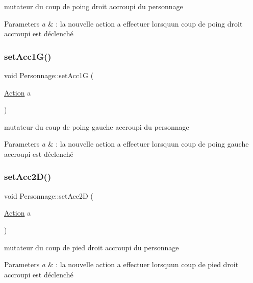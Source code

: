 mutateur du coup de poing droit accroupi du personnage 


\begin{DoxyParams}{Parameters}
{\em a} & \+: la nouvelle action a effectuer lorsqu\textquotesingle{}un coup de poing droit accroupi est déclenché \\
\hline
\end{DoxyParams}
\mbox{\label{class_personnage_aa44ab7df73f244df3ac675661630e7de}} 
\subsubsection{\texorpdfstring{set\+Acc1\+G()}{setAcc1G()}}
{\footnotesize\ttfamily void Personnage\+::set\+Acc1G (\begin{DoxyParamCaption}\item[{\hyperlink{class_action}{Action}}]{a }\end{DoxyParamCaption})}



mutateur du coup de poing gauche accroupi du personnage 


\begin{DoxyParams}{Parameters}
{\em a} & \+: la nouvelle action a effectuer lorsqu\textquotesingle{}un coup de poing gauche accroupi est déclenché \\
\hline
\end{DoxyParams}
\mbox{\label{class_personnage_abadec9cf87f25796e9467b0c58750a60}} 
\subsubsection{\texorpdfstring{set\+Acc2\+D()}{setAcc2D()}}
{\footnotesize\ttfamily void Personnage\+::set\+Acc2D (\begin{DoxyParamCaption}\item[{\hyperlink{class_action}{Action}}]{a }\end{DoxyParamCaption})}



mutateur du coup de pied droit accroupi du personnage 


\begin{DoxyParams}{Parameters}
{\em a} & \+: la nouvelle action a effectuer lorsqu\textquotesingle{}un coup de pied droit accroupi est déclenché \\
\hline
\end{DoxyParams}
\mbox{\label{class_personnage_a879d794e4f9f8909b72223e71a11a677}} 
